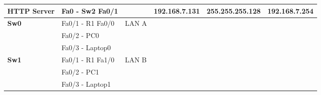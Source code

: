 \documentclass[11pt,a4paper]{report}
\begin{document}
\begin{center}
\begin{longtable}{@{}llllll@{}}
                \textbf{HTTP Server}                               & Fa0 - Sw2 Fa0/1                                          &                                                       & 192.168.7.131                                    & 255.255.255.128                                           & 192.168.7.254                                         \\* \midrule
                \multirow{3}{*}{\textbf{Sw0}}                      & Fa0/1 - R1 Fa0/0                                         & \multirow{3}{*}{LAN A}                                & \multicolumn{1}{c}{}                             & \multicolumn{1}{c}{}                                      & \multicolumn{1}{c}{}                                  \\
                                                                   & Fa0/2 - PC0                                              &                                                       & \multicolumn{1}{c}{}                             & \multicolumn{1}{c}{}                                      & \multicolumn{1}{c}{}                                  \\
                                                                   & Fa0/3 - Laptop0                                          &                                                       & \multicolumn{1}{c}{}                             & \multicolumn{1}{c}{}                                      & \multicolumn{1}{c}{}                                  \\* \midrule
                \multirow{3}{*}{\textbf{Sw1}}                      & Fa0/1 - R1 Fa1/0                                         & \multirow{3}{*}{LAN B}                                & \multicolumn{1}{c}{}                             & \multicolumn{1}{c}{}                                      & \multicolumn{1}{c}{}                                  \\
                                                                   & Fa0/2 - PC1                                              &                                                       & \multicolumn{1}{c}{}                             & \multicolumn{1}{c}{}                                      & \multicolumn{1}{c}{}                                  \\
                                                                   & Fa0/3 - Laptop1                                          &                                                       & \multicolumn{1}{c}{}                             & \multicolumn{1}{c}{}                                      & \multicolumn{1}{c}{}                                  \\* \midrule

\end{longtable}
\end{center}
\end{document}
